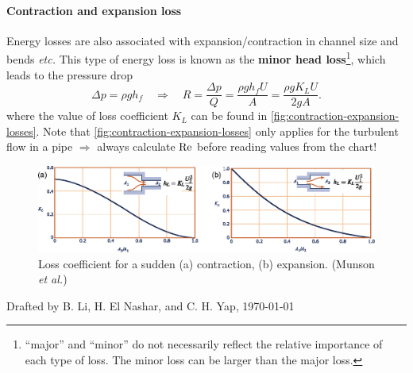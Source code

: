 \documentclass[a4paper]{article}
\begin{document}
\paragraph{Contraction and expansion loss} Energy losses are also associated with expansion/contraction in channel size and bends \textit{etc.} This type of energy loss is known as the \textbf{minor head loss}\footnote{``major'' and ``minor'' do not necessarily reflect the relative importance of each type of loss. The minor loss can be larger than the major loss.}, which leads to the pressure drop
\[
    \Delta p = \rho g h_{f}  \quad \Rightarrow \quad R = \frac{\Delta p}{Q} = \frac{\rho g h_{f} U}{A} = \frac{\rho g K_L U}{2gA}.
\]
where the value of loss coefficient $K_L$ can be found in \autoref{fig:contraction-expansion-losses}. Note that \autoref{fig:contraction-expansion-losses} only applies for the turbulent flow in a pipe $\Rightarrow$ always calculate $\rm Re$ before reading values from the chart!
\begin{figure}[H]
    \centering
    \includegraphics{img/contraction_expansion_loss.eps}
    \caption{Loss coefficient for a sudden (a) contraction, (b) expansion. {\color{gray} (Munson \textit{et al.})}}
    \label{fig:contraction-expansion-losses}
\end{figure}

\vfill
{\small \color{gray}Drafted by B. Li, H. El Nashar, and C. H. Yap,  \today}
% 
\end{document}
